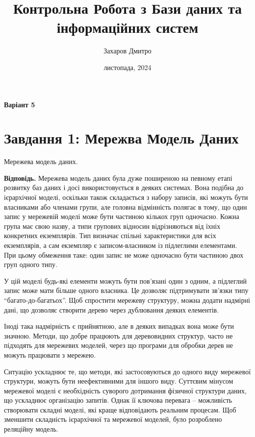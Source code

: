 \documentclass{hw_template}
\title{\huge\sffamily\bfseries Контрольна Робота з Бази даних та інформаційних систем}
\author{\Large\sffamily Захаров Дмитро}
\date{\sffamily 14 листопада, 2024}
\begin{document}
\pagestyle{fancy}

\maketitle

\begin{center}
    \textbf{Варіант 5}
\end{center}

\tableofcontents

\pagebreak

\section{Завдання 1: Мережва Модель Даних}

\begin{problem}
    Мережева модель даних.
\end{problem}

\textbf{Відповідь.} Мережева модель даних була дуже поширеною на певному етапі
розвитку баз даних і досі використовується в деяких системах. Вона подібна до
ієрархічної моделі, оскільки також складається з набору записів, які можуть бути
власниками або членами групи, але головна відмінність полягає в тому, що один
запис у мережевій моделі може бути частиною кількох груп одночасно. Кожна група
має свою назву, а типи групових відносин відрізняються від їхніх конкретних
екземплярів. Тип визначає спільні характеристики для всіх екземплярів, а сам
екземпляр є записом-власником із підлеглими елементами. При цьому обмеження
таке: один запис не може одночасно бути частиною двох груп одного типу.

У цій моделі будь-які елементи можуть бути пов’язані один з одним, а підлеглий
запис може мати більше одного власника. Це дозволяє підтримувати зв’язки типу
``багато-до-багатьох''. Щоб спростити мережеву структуру, можна додати надмірні
дані, що дозволяє створити дерево через дублювання деяких елементів.

Іноді така надмірність є прийнятною, але в деяких випадках вона може бути
значною. Методи, що добре працюють для деревовидних структур, часто не підходять
для мережевих моделей, через що програми для обробки дерев не можуть працювати з
мережею.

Ситуацію ускладнює те, що методи, які застосовуються до одного виду мережевої
структури, можуть бути неефективними для іншого виду. Суттєвим мінусом мережевої
моделі є необхідність суворого дотримання фізичної структури даних, що ускладнює
організацію запитів. Однак її ключова перевага -- можливість створювати складні
моделі, які краще відповідають реальним процесам. Щоб зменшити складність
ієрархічної та мережевої моделей, було розроблено реляційну модель.
\end{document}

